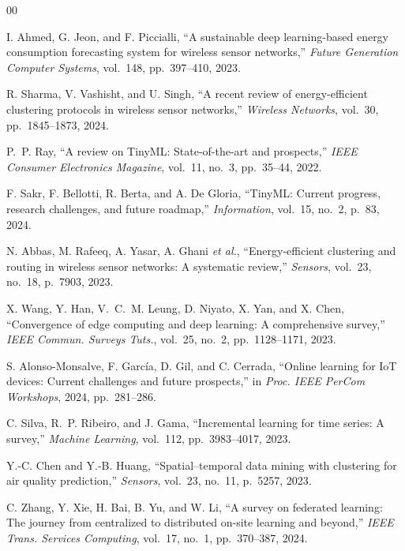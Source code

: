 \documentclass[conference]{IEEEtran}
\begin{document}
\begin{thebibliography}{00}

I. Ahmed, G. Jeon, and F. Piccialli, ``A sustainable deep learning-based energy consumption forecasting system for wireless sensor networks,'' \textit{Future Generation Computer Systems}, vol.~148, pp.~397--410, 2023.

R. Sharma, V. Vashisht, and U. Singh, ``A recent review of energy-efficient clustering protocols in wireless sensor networks,'' \textit{Wireless Networks}, vol.~30, pp.~1845--1873, 2024.

P.~P. Ray, ``A review on TinyML: State-of-the-art and prospects,'' \textit{IEEE Consumer Electronics Magazine}, vol.~11, no.~3, pp.~35--44, 2022.

F. Sakr, F. Bellotti, R. Berta, and A. De Gloria, ``TinyML: Current progress, research challenges, and future roadmap,'' \textit{Information}, vol.~15, no.~2, p.~83, 2024.

N. Abbas, M. Rafeeq, A. Yasar, A. Ghani \textit{et al.}, ``Energy-efficient clustering and routing in wireless sensor networks: A systematic review,'' \textit{Sensors}, vol.~23, no.~18, p.~7903, 2023.

X. Wang, Y. Han, V.~C.~M. Leung, D. Niyato, X. Yan, and X. Chen, ``Convergence of edge computing and deep learning: A comprehensive survey,'' \textit{IEEE Commun. Surveys Tuts.}, vol.~25, no.~2, pp.~1128--1171, 2023.

S. Alonso-Monsalve, F. Garc\'{i}a, D. Gil, and C. Cerrada, ``Online learning for IoT devices: Current challenges and future prospects,'' in \textit{Proc. IEEE PerCom Workshops}, 2024, pp.~281--286.

C. Silva, R.~P. Ribeiro, and J. Gama, ``Incremental learning for time series: A survey,'' \textit{Machine Learning}, vol.~112, pp.~3983--4017, 2023.

Y.-C. Chen and Y.-B. Huang, ``Spatial--temporal data mining with clustering for air quality prediction,'' \textit{Sensors}, vol.~23, no.~11, p.~5257, 2023.

C. Zhang, Y. Xie, H. Bai, B. Yu, and W. Li, ``A survey on federated learning: The journey from centralized to distributed on-site learning and beyond,'' \textit{IEEE Trans. Services Computing}, vol.~17, no.~1, pp.~370--387, 2024.


\end{thebibliography}
\end{document}
